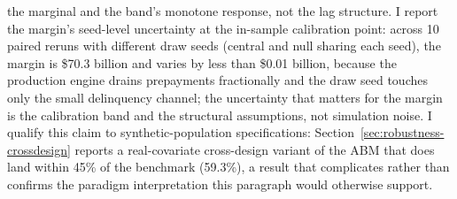 \documentclass[12pt]{article}
\begin{document}
the marginal and the band's monotone response, not the lag structure. I report the margin's seed-level uncertainty at the in-sample calibration point: across 10 paired reruns with different draw seeds (central and null sharing each seed), the margin is \$70.3 billion and varies by less than \$0.01 billion, because the production engine drains prepayments fractionally and the draw seed touches only the small delinquency channel; the uncertainty that matters for the margin is the calibration band and the structural assumptions, not simulation noise. I qualify this claim to synthetic-population specifications: Section~\ref{sec:robustness-crossdesign} reports a real-covariate cross-design variant of the ABM that does land within 45\% of the benchmark (59.3\%), a result that complicates rather than confirms the paradigm interpretation this paragraph would otherwise support.
\end{document}
